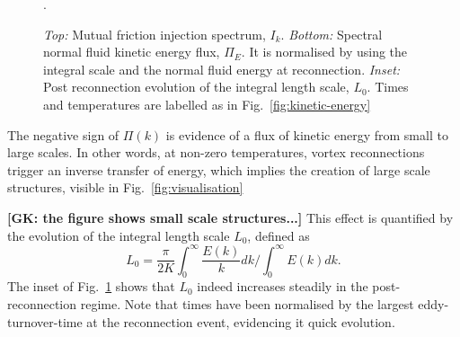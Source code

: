 \documentclass[%
 reprint,
 amsmath,amssymb,
 aps,
 prl,
]{revtex4-2}
\newcommand*{\NOTE}[1]{\textbf{\color{red}[#1]}}
\begin{document}
{\begin{figure}[t]
\caption{\emph{Top:} Mutual friction injection spectrum, $I_k$. 
\emph{Bottom:} Spectral normal fluid kinetic energy flux, $\Pi_E$. It is normalised by using the integral scale and the normal fluid energy at reconnection.
\emph{Inset:} Post reconnection evolution of the integral length scale, $L_0$.
Times and temperatures are labelled as in Fig.~\ref{fig:kinetic-energy}}.
\label{fig:energy-flux}
\end{figure}
%
The negative sign of $\Pi(k)$ is evidence of a flux of kinetic 
energy from small to large scales. In other words, at non-zero temperatures,
vortex reconnections trigger an inverse transfer of energy, 
which implies the creation of large scale structures, visible
in Fig.~\ref{fig:visualisation}} \NOTE{GK: the figure shows small scale structures...}
This effect is quantified by the evolution of the integral length scale $L_0$, defined as
\begin{equation}
    L_0 = \frac{\pi}{2 K}\int_0^{\infty}\frac{E(k)}{k}dk \Big/ \int_0^{\infty}\!\!E(k)dk.
\end{equation}
The inset of Fig.~\ref{fig:energy-flux} shows that
$L_0$ indeed  increases steadily in the post-reconnection regime. Note that times have been normalised by the largest eddy-turnover-time at the reconnection event, evidencing  it quick evolution.
\end{document}
